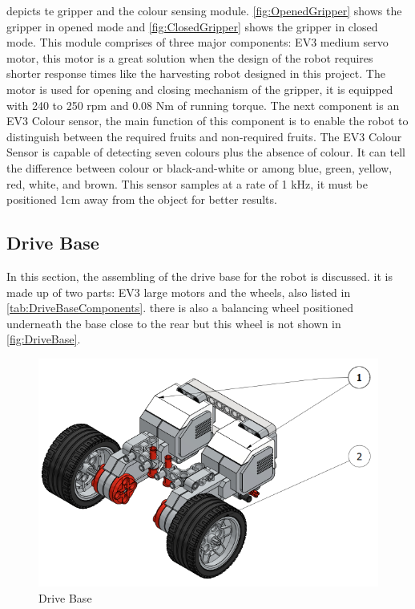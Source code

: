 \noindent {} depicts te gripper and the colour sensing module. \vref{fig:OpenedGripper} shows the gripper in opened mode and \vref{fig:ClosedGripper} shows the gripper in closed mode. This module comprises of three major components: EV3 medium servo motor, this motor is a great solution when the design of the robot requires shorter response times like the harvesting robot designed in this project. The motor is used for opening and closing mechanism of the gripper, it is equipped with 240 to 250 rpm and 0.08 Nm of running torque. The next component is an EV3 Colour sensor, the main function of this component is to enable the robot to distinguish between the required fruits and non-required fruits. The EV3 Colour Sensor is capable of detecting seven colours plus the absence of colour. It can tell the difference between colour or black-and-white or among blue, green, yellow, red, white, and brown. This sensor samples at a rate of 1 kHz, it must be positioned 1cm away from the object for better results.
\newpage
\subsection{Drive Base}\label{sec:DriveBase}

\noindent In this section, the assembling of the drive base for the robot is discussed. it is made up of two parts: EV3 large motors and the wheels, also listed in \vref{tab:DriveBaseComponents}. there is also a balancing wheel positioned underneath the base close to the rear but this wheel is not shown in \vref{fig:DriveBase}.

\begin{figure}[!ht]
	\centering
	\includegraphics[width=\linewidth]{Graphics/DriveBase}
	\caption{Drive Base}
	\label{fig:DriveBase}
\end{figure}

